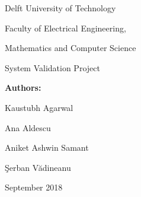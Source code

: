 \begin{titlepage}
	\begin{center}
		{\Large Delft University of Technology}
		\par\vspace*{2mm}
		{\Large Faculty of Electrical Engineering,
		
		        Mathematics and Computer Science}
		\par\vspace*{3mm}
		
		\par\vspace*{35mm}
		{\Huge System Validation Project}
		\par\vspace*{30mm}
		\vspace*{1mm} \Large \textbf{\Large Authors:}\vspace*{1mm} \\
		\par\vspace*{1mm}
		{\Large Kaustubh Agarwal
		
		\Large Ana Aldescu
		
        \Large Aniket Ashwin Samant
        
        \Large Şerban Vădineanu
        }

		\par\vspace*{60mm}
		\Large September 2018
	\end{center}
\end{titlepage}
